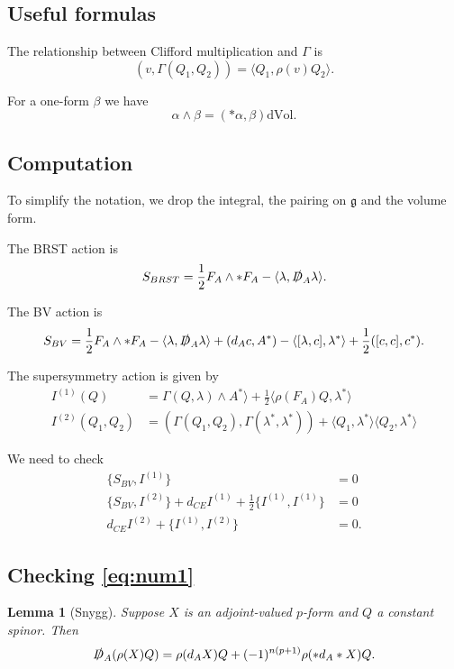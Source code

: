 \documentclass[12pt]{amsart}
\newcommand{\dvol}{\mathrm{dVol}}
\newcommand{\sD}{\slashed{D}}
\newcommand{\g}{\mathfrak{g}}
\newtheorem{lm}[thm]{Lemma}
\begin{document}
\section{}

\subsection{Useful formulas}

The relationship between Clifford multiplication and $\Gamma$ is
\[(v, \Gamma(Q_1, Q_2)) = \langle Q_1, \rho(v) Q_2\rangle.\]

For a one-form $\beta$ we have
\[\alpha\wedge \beta = (\ast\alpha, \beta)\dvol.\]

\subsection{Computation}
To simplify the notation, we drop the integral, the pairing on $\g$ and the volume form.

The BRST action is
\[S_{BRST} = \frac{1}{2} F_A\wedge \ast F_A - \langle\lambda, \sD_A\lambda\rangle.\]

The BV action is
\[S_{BV} = \frac{1}{2} F_A\wedge \ast F_A - \langle\lambda, \sD_A\lambda\rangle + (d_A c, A^*) - \langle[\lambda, c], \lambda^*\rangle + \frac{1}{2}([c, c], c^*).\]

The supersymmetry action is given by
\begin{align*}
I^{(1)}(Q) &= \Gamma(Q, \lambda)\wedge A^*\rangle + \frac{1}{2} \langle \rho(F_A) Q, \lambda^*\rangle \\
I^{(2)}(Q_1, Q_2) &= (\Gamma(Q_1, Q_2), \Gamma(\lambda^*, \lambda^*)) + \langle Q_1, \lambda^*\rangle \langle Q_2, \lambda^*\rangle
\end{align*}

We need to check
\begin{align}
\{S_{BV}, I^{(1)}\} &= 0 \label{eq:num1} \\
\{S_{BV}, I^{(2)}\} + d_{CE} I^{(1)} + \frac{1}{2}\{I^{(1)}, I^{(1)}\} &= 0 \label{eq:num2} \\
d_{CE} I^{(2)} + \{I^{(1)}, I^{(2)}\} &= 0. \label{eq:num3}
\end{align}

\subsection{Checking \eqref{eq:num1}}

\begin{lm}[Snygg]
Suppose $X$ is an adjoint-valued $p$-form and $Q$ a constant spinor. Then
\[\sD_A(\rho(X)Q) = \rho(d_A X) Q+ (-1)^{n(p+1)}\rho(\ast d_A \ast X) Q.\]
\label{lm:snygg}
\end{lm}
\end{document}
